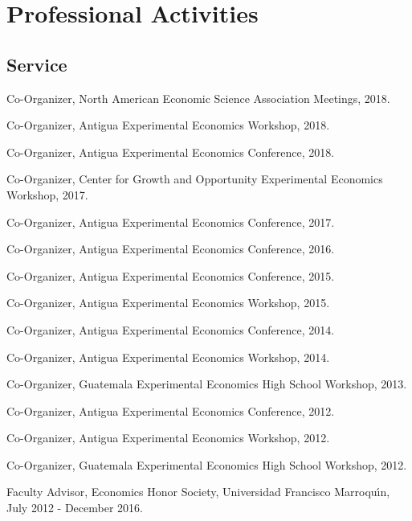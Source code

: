 \documentclass{article}%
\renewenvironment{itemize}{
\begin{list}{}{
\setlength{\leftmargin}{1.5em}
}
}{
\end{list}
}
\begin{document}
\section*{Professional Activities}

\subsection*{Service}

\begin{itemize}
\item Co-Organizer, North American Economic Science Association Meetings, 2018. 

\item Co-Organizer, Antigua Experimental Economics Workshop, 2018. 

\item Co-Organizer, Antigua Experimental Economics Conference, 2018.

\item Co-Organizer, Center for Growth and Opportunity Experimental Economics Workshop, 2017. 

\item Co-Organizer, Antigua Experimental Economics Conference, 2017. 

\item Co-Organizer, Antigua Experimental Economics Conference, 2016. 

\item Co-Organizer, Antigua Experimental Economics Conference, 2015. 

\item Co-Organizer, Antigua Experimental Economics Workshop, 2015. 

\item Co-Organizer, Antigua Experimental Economics Conference, 2014. 

\item Co-Organizer, Antigua Experimental Economics Workshop, 2014. 

\item Co-Organizer, Guatemala Experimental Economics High School Workshop, 2013.

\item Co-Organizer, Antigua Experimental Economics Conference, 2012. 

\item Co-Organizer, Antigua Experimental Economics Workshop, 2012. 

\item Co-Organizer, Guatemala Experimental Economics High School Workshop, 2012.

\item Faculty Advisor, Economics Honor Society, Universidad Francisco Marroqu\'{\i}n, July 2012 - December 2016.

\end{itemize}
\end{document}
